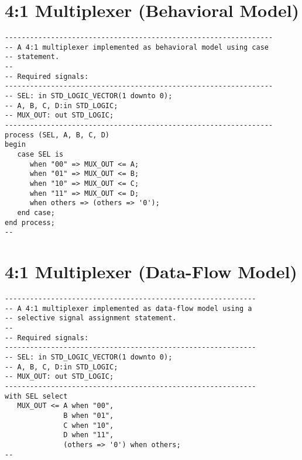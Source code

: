 \section{4:1 Multiplexer (Behavioral Model)}
\noindent
\begin{minipage}{1\linewidth}
\begin{lstlisting}
----------------------------------------------------------------
-- A 4:1 multiplexer implemented as behavioral model using case
-- statement. 
--
-- Required signals: 
----------------------------------------------------------------
-- SEL: in STD_LOGIC_VECTOR(1 downto 0);
-- A, B, C, D:in STD_LOGIC;
-- MUX_OUT: out STD_LOGIC;
----------------------------------------------------------------
process (SEL, A, B, C, D)
begin
   case SEL is
      when "00" => MUX_OUT <= A;
      when "01" => MUX_OUT <= B;
      when "10" => MUX_OUT <= C;
      when "11" => MUX_OUT <= D;
      when others => (others => '0');
   end case;
end process;
--
\end{lstlisting}
\end{minipage}

\section{4:1 Multiplexer (Data-Flow Model)}
\noindent
\begin{minipage}{1\linewidth}
\begin{lstlisting}
------------------------------------------------------------
-- A 4:1 multiplexer implemented as data-flow model using a
-- selective signal assignment statement. 
--
-- Required signals: 
------------------------------------------------------------
-- SEL: in STD_LOGIC_VECTOR(1 downto 0);
-- A, B, C, D:in STD_LOGIC;
-- MUX_OUT: out STD_LOGIC;
------------------------------------------------------------
with SEL select
   MUX_OUT <= A when "00", 
              B when "01", 
              C when "10", 
              D when "11", 
              (others => '0') when others;
--
\end{lstlisting}
\end{minipage}

